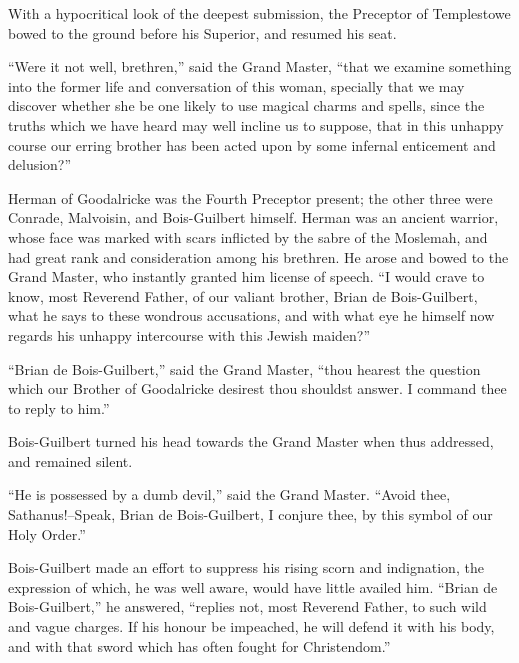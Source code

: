 With a hypocritical look of the deepest submission, the Preceptor of
Templestowe bowed to the ground before his Superior, and resumed his
seat.

``Were it not well, brethren,'' said the Grand Master, ``that we examine
something into the former life and conversation of this woman, specially
that we may discover whether she be one likely to use magical charms and
spells, since the truths which we have heard may well incline us to
suppose, that in this unhappy course our erring brother has been acted
upon by some infernal enticement and delusion?''

Herman of Goodalricke was the Fourth Preceptor present; the other three
were Conrade, Malvoisin, and Bois-Guilbert himself. Herman was an
ancient warrior, whose face was marked with scars inflicted by the sabre
of the Moslemah, and had great rank and consideration among his
brethren. He arose and bowed to the Grand Master, who instantly granted
him license of speech. ``I would crave to know, most Reverend Father, of
our valiant brother, Brian de Bois-Guilbert, what he says to these
wondrous accusations, and with what eye he himself now regards his
unhappy intercourse with this Jewish maiden?''

``Brian de Bois-Guilbert,'' said the Grand Master, ``thou hearest the
question which our Brother of Goodalricke desirest thou shouldst answer.
I command thee to reply to him.''

Bois-Guilbert turned his head towards the Grand Master when thus
addressed, and remained silent.

``He is possessed by a dumb devil,'' said the Grand Master. ``Avoid
thee, Sathanus!--Speak, Brian de Bois-Guilbert, I conjure thee, by this
symbol of our Holy Order.''

Bois-Guilbert made an effort to suppress his rising scorn and
indignation, the expression of which, he was well aware, would have
little availed him. ``Brian de Bois-Guilbert,'' he answered, ``replies
not, most Reverend Father, to such wild and vague charges. If his honour
be impeached, he will defend it with his body, and with that sword which
has often fought for Christendom.''


